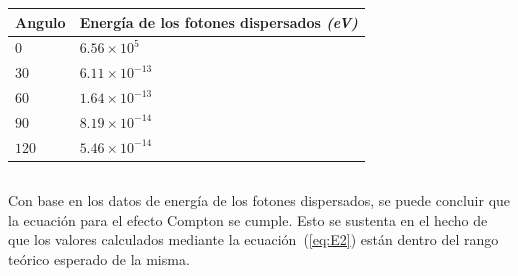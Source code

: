 \documentclass[letterpaper, 12pt]{article}
\newcommand{\bolditalic}[1]{\textbf{\textit{#1}}}
\begin{document}
\begin{table}[H]
      \begin{center}
            \begin{tabularx}{.8\linewidth}{|>{\centering\arraybackslash}X|>{\centering\arraybackslash}X|}
                  \hline
                  Angulo & Energía de los fotones dispersados \bolditalic{(eV)} \\\hline
                  $0$    & $6.56 \times 10^{5}$                                 \\\hline
                  $30$   & $6.11 \times 10^{-13}$                               \\\hline
                  $60$   & $1.64 \times 10^{-13}$                               \\\hline
                  $90$   & $8.19 \times 10^{-14}$                               \\\hline
                  $120$  & $5.46 \times 10^{-14}$                               \\\hline

            \end{tabularx}
      \end{center}
\end{table}

\subsection{}

Con base en los datos de energía de los fotones
dispersados, se puede concluir que la ecuación para el
efecto Compton se cumple. Esto se sustenta en el hecho de
que los valores calculados mediante la
ecuación~(\ref{eq:E2}) están dentro del rango teórico
esperado de la misma.

\subsection{}
\end{document}
